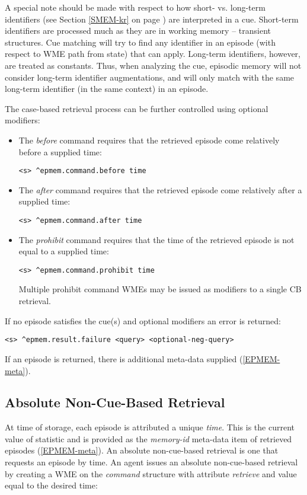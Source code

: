A special note should be made with respect to how short- vs. long-term identifiers (see Section \ref{SMEM-kr} on page \pageref{SMEM-kr}) are interpreted in a cue.  
Short-term identifiers are processed much as they are in working memory -- transient structures.  
Cue matching will try to find any identifier in an episode (with respect to WME path from state) that can apply.  
Long-term identifiers, however, are treated as constants. 
Thus, when analyzing the cue, episodic memory will not consider long-term identifier augmentations, and will only match with the same long-term identifier (in the same context) in an episode.

The case-based retrieval process can be further controlled using optional modifiers:

\begin{itemize}

\item 
The \emph{before} command requires that the retrieved episode come relatively before a supplied time:
\begin{verbatim}
<s> ^epmem.command.before time
\end{verbatim}

\item 
The \emph{after} command requires that the retrieved episode come relatively after a supplied time:
\begin{verbatim}
<s> ^epmem.command.after time
\end{verbatim}

\item 
The \emph{prohibit} command requires that the time of the retrieved episode is not equal to a supplied time:
\begin{verbatim}
<s> ^epmem.command.prohibit time
\end{verbatim}
Multiple prohibit command WMEs may be issued as modifiers to a single CB retrieval.

\end{itemize}

If no episode satisfies the cue(s) and optional modifiers an error is returned:

\begin{verbatim}
<s> ^epmem.result.failure <query> <optional-neg-query>
\end{verbatim}

If an episode is returned, there is additional meta-data supplied (\ref{EPMEM-meta}).

\subsection{Absolute Non-Cue-Based Retrieval}
At time of storage, each episode is attributed a unique \emph{time}.  
This is the current value of  statistic and is provided as the \emph{memory-id} meta-data item of retrieved episodes (\ref{EPMEM-meta}).  
An absolute non-cue-based retrieval is one that requests an episode by time.  
An agent issues an absolute non-cue-based retrieval by creating a WME on the \emph{command} structure with attribute \emph{retrieve} and value equal to the desired time:


